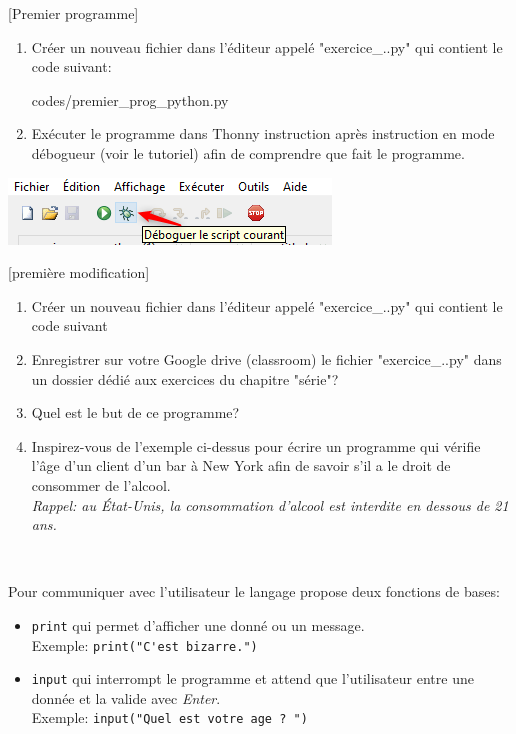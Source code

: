 \documentclass[a4paper,12pt]{article}
\begin{document}
\exo{}[Premier programme]  ~\\ 
\begin{enumerate}
	\item Créer un nouveau fichier dans l'éditeur appelé "exercice\_\thesection.\getexocompteur.py" qui contient le code suivant:
	
	{codes/premier_prog_python.py}
	\item Exécuter le programme dans Thonny instruction après instruction en mode débogueur (voir le tutoriel) afin de comprendre que fait le programme.
\end{enumerate}
\begin{center}
	\includegraphics{Thonny-debug.png}
\end{center}
\finexo
\exo{}[première modification]  ~\\ 
	\begin{enumerate}
		\item Créer un nouveau fichier dans l'éditeur appelé "exercice\_\thesection.\getexocompteur.py" qui contient le code suivant
		
		\item Enregistrer sur votre Google drive (classroom) le fichier "exercice\_\thesection.\getexocompteur.py" dans un dossier dédié aux exercices du chapitre "série\thesection"?
		\item Quel est le but de ce programme?
		\item Inspirez-vous de l'exemple ci-dessus pour écrire un programme qui vérifie l'âge d'un client d'un bar à New York afin de savoir s'il a le droit de consommer de l'alcool.\\ \textit{Rappel: au État-Unis, la consommation d'alcool est interdite en dessous de 21 ans.}
	\end{enumerate}
	\begin{correction}
		~\\ \vspace{-5pt}
		
	\end{correction}
\finexo

\begin{apprendre}
	Pour communiquer avec l'utilisateur le langage \py propose deux fonctions de bases:
	\begin{itemize}
		\item \lstinline{print} qui permet d'afficher une donné ou un message.\\
		Exemple: \lstinline{print("C'est bizarre.")}
		\item \lstinline{input} qui interrompt le programme et attend que l'utilisateur entre une donnée et la valide avec \textit{Enter}.\\
		Exemple: \lstinline{input("Quel est votre age ? ")}
	\end{itemize}
\end{apprendre}
\end{document}
